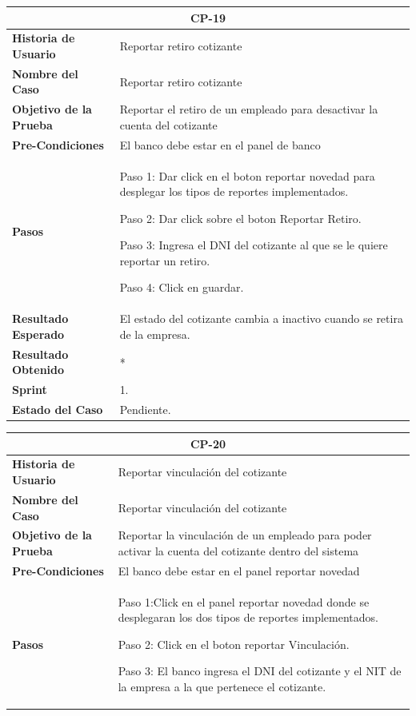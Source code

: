 \documentclass[12pt,a4paper]{article}
\begin{document}
\begin{center}
\begin{tabular}{|m{5cm}|m{9cm}|}
\hline
\multicolumn{2}{|c|}{\textbf{CP-19}} \\
\hline
\textbf{Historia de Usuario} & Reportar retiro cotizante \\
\hline
\textbf{Nombre del Caso} & Reportar retiro cotizante \\
\hline
\textbf{Objetivo de la Prueba} &  Reportar el retiro de un empleado para desactivar la cuenta del cotizante\\
\hline
\textbf{Pre-Condiciones} & El banco debe estar en el panel de banco\\
\hline
\textbf{Pasos} & Paso 1: Dar click en el boton reportar novedad para desplegar los tipos de reportes implementados.

Paso 2: Dar click sobre el boton Reportar Retiro.

Paso 3: Ingresa el DNI del cotizante al que se le quiere reportar un retiro.

Paso 4: Click en guardar.  \\
\hline
\textbf{Resultado Esperado} & El estado del cotizante cambia a inactivo cuando se retira de la empresa. \\
\hline
\textbf{Resultado Obtenido} & * \\
\hline
\textbf{Sprint} & 1. \\
\hline
\textbf{Estado del Caso} & Pendiente.\\
\hline
\end{tabular}
\vspace{5mm}

\begin{tabular}{|m{5cm}|m{9cm}|}
\hline
\multicolumn{2}{|c|}{\textbf{CP-20}} \\
\hline
\textbf{Historia de Usuario} & Reportar vinculación del cotizante \\
\hline
\textbf{Nombre del Caso} & Reportar vinculación del cotizante \\
\hline
\textbf{Objetivo de la Prueba} & Reportar la vinculación de un empleado para poder activar la cuenta del cotizante dentro del sistema \\
\hline
\textbf{Pre-Condiciones} & El banco debe estar en el panel reportar novedad \\
\hline
\textbf{Pasos} & Paso 1:Click en el panel reportar novedad donde se desplegaran los dos tipos de reportes implementados.

Paso 2: Click en el boton reportar Vinculación.

Paso 3: El banco ingresa el DNI del cotizante y el NIT de la empresa a la que pertenece el cotizante.


\end{tabular}
\end{center}
\end{document}
